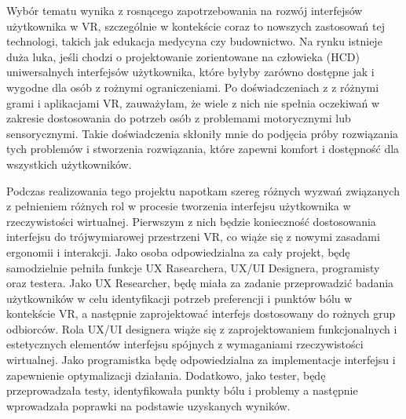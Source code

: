 \documentclass[xodstep]{wnspt}
\begin{document}
Wybór tematu wynika z rosnącego zapotrzebowania na rozwój interfejsów użytkownika w VR, szczególnie w kontekście coraz to nowszych zastosowań tej technologi, takich jak edukacja medycyna czy budownictwo. Na rynku istnieje duża luka, jeśli chodzi o projektowanie zorientowane na człowieka (HCD) uniwersalnych interfejsów użytkownika, które byłyby zarówno dostępne jak i wygodne dla osób z rożnymi ograniczeniami. Po doświadczeniach z z różnymi grami i aplikacjami VR, zauważyłam, że wiele z nich nie spełnia oczekiwań w zakresie dostosowania do potrzeb osób z problemami motorycznymi lub sensorycznymi. Takie doświadczenia skłoniły mnie do podjęcia próby rozwiązania tych problemów i stworzenia rozwiązania, które zapewni komfort i dostępność dla wszystkich użytkowników.

Podczas realizowania tego projektu napotkam szereg różnych wyzwań związanych z pełnieniem różnych rol w procesie tworzenia interfejsu użytkownika w rzeczywistości wirtualnej. Pierwszym z nich będzie konieczność dostosowania interfejsu do trójwymiarowej przestrzeni VR, co wiąże się z nowymi zasadami ergonomii i interakcji. Jako osoba odpowiedzialna za cały projekt, będę samodzielnie pełniła funkcje UX Rasearchera, UX/UI Designera, programisty oraz testera. Jako UX Researcher, będę miała za zadanie przeprowadzić badania użytkowników w celu identyfikacji potrzeb preferencji i punktów bólu w kontekście VR, a następnie zaprojektować interfejs dostosowany do rożnych grup odbiorców. Rola UX/UI designera wiąże się z zaprojektowaniem funkcjonalnych i estetycznych elementów interfejsu spójnych z wymaganiami rzeczywistości wirtualnej. Jako programistka będę odpowiedzialna za implementacje interfejsu i zapewnienie optymalizacji działania. Dodatkowo, jako tester, będę przeprowadzała testy, identyfikowała punkty bólu i problemy a następnie wprowadzała poprawki na podstawie uzyskanych wyników.
\end{document}
